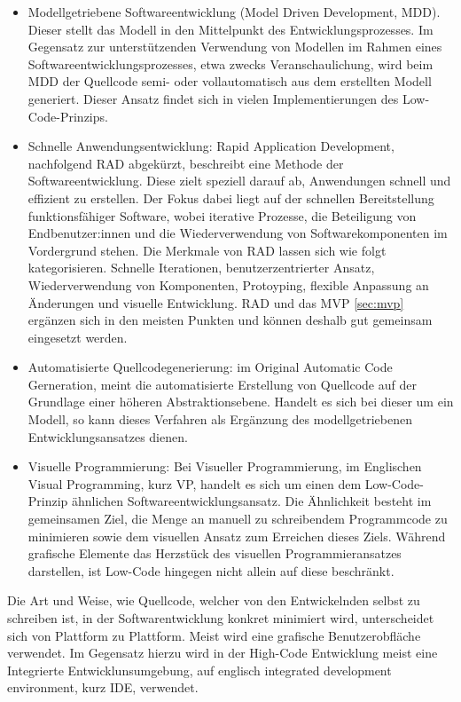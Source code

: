 \documentclass[acmtog, language=ngerman]{acmart}
\begin{document}
\begin{itemize}
    \item Modellgetriebene Softwareentwicklung (Model Driven Development, MDD). Dieser stellt das Modell in den Mittelpunkt des Entwicklungsprozesses. Im Gegensatz zur unterstützenden Verwendung von Modellen im Rahmen eines Softwareentwicklungsprozesses, etwa zwecks Veranschaulichung, wird beim MDD der Quellcode semi- oder vollautomatisch aus dem erstellten Modell generiert. Dieser Ansatz findet sich in vielen Implementierungen des Low-Code-Prinzips.
    \item Schnelle Anwendungsentwicklung: Rapid Application Development, nachfolgend RAD abgekürzt, beschreibt eine Methode der Softwareentwicklung. Diese zielt speziell darauf ab, Anwendungen schnell und effizient zu erstellen. Der Fokus dabei liegt auf der schnellen Bereitstellung funktionsfähiger Software, wobei iterative Prozesse, die Beteiligung von Endbenutzer:innen und die Wiederverwendung von Softwarekomponenten im Vordergrund stehen.
Die Merkmale von RAD lassen sich wie folgt kategorisieren. Schnelle Iterationen, benutzerzentrierter Ansatz, Wiederverwendung von Komponenten, Protoyping, flexible Anpassung an Änderungen und visuelle Entwicklung. \cite{rapid_protoyping} RAD und das MVP \ref{sec:mvp} ergänzen sich in den meisten Punkten und können deshalb gut gemeinsam eingesetzt werden.
    \item Automatisierte Quellcodegenerierung: im Original Automatic Code Gerneration, meint die automatisierte Erstellung von Quellcode auf der Grundlage einer höheren Abstraktionsebene. Handelt es sich bei dieser um ein Modell, so kann dieses Verfahren als Ergänzung des modellgetriebenen Entwicklungsansatzes dienen.
    \item Visuelle Programmierung: Bei Visueller Programmierung, im Englischen Visual Programming, kurz VP,  handelt es sich um einen dem Low-Code-Prinzip ähnlichen Softwareentwicklungsansatz. Die Ähnlichkeit besteht im gemeinsamen Ziel, die Menge an manuell zu schreibendem Programmcode zu minimieren sowie dem visuellen Ansatz zum Erreichen dieses Ziels. Während grafische Elemente das Herzstück des visuellen Programmieransatzes darstellen, ist Low-Code hingegen nicht allein auf diese beschränkt.
\end{itemize}

Die Art und Weise, wie Quellcode, welcher von den Entwickelnden selbst zu schreiben ist, in der Softwarentwicklung konkret minimiert wird, unterscheidet sich von Plattform zu Plattform. Meist wird eine grafische Benutzerobfläche verwendet. Im Gegensatz hierzu wird in der High-Code Entwicklung meist eine Integrierte Entwicklunsumgebung, auf englisch integrated development  environment, kurz IDE, verwendet. 
\end{document}
